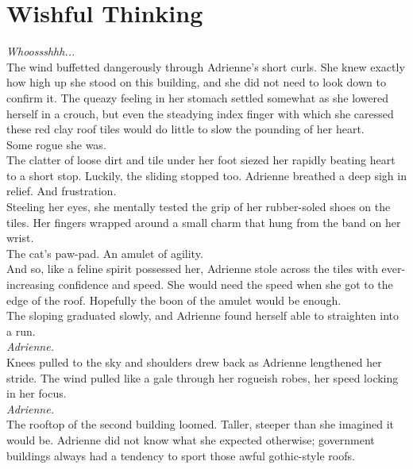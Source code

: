 \chapter{Wishful Thinking}

\textit{Whoossshhh...}\\

The wind buffetted dangerously through Adrienne's short curls. 
She knew exactly how high up she stood on this building, and she did not need to look down to confirm it.
The queazy feeling in her stomach settled somewhat as she lowered herself in a crouch, 
but even the steadying index finger with which she caressed these red clay roof tiles would do little to slow the pounding of her heart.\\

Some rogue she was.\\

The clatter of loose dirt and tile under her foot siezed her rapidly beating heart to a short stop.
Luckily, the sliding stopped too.
Adrienne breathed a deep sigh in relief. 
And frustration.\\

Steeling her eyes, she mentally tested the grip of her rubber-soled shoes on the tiles. 
Her fingers wrapped around a small charm that hung from the band on her wrist.\\

The cat's paw-pad. An amulet of agility.\\

And so, like a feline spirit possessed her, Adrienne stole across the tiles with ever-increasing confidence and speed.
She would need the speed when she got to the edge of the roof.
Hopefully the boon of the amulet would be enough.\\

The sloping graduated slowly, and Adrienne found herself able to straighten into a run.\\

\textit{Adrienne.}\\

Knees pulled to the sky and shoulders drew back as Adrienne lengthened her stride.
The wind pulled like a gale through her rogueish robes, her speed locking in her focus.\\

\textit{Adrienne.}\\

The rooftop of the second building loomed. 
Taller, steeper than she imagined it would be.
Adrienne did not know what she expected otherwise; government buildings always had a tendency to sport those awful gothic-style roofs. \\


